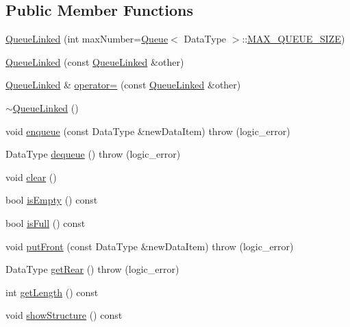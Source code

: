 \subsection*{\-Public \-Member \-Functions}
\begin{DoxyCompactItemize}
\item 
\hyperlink{class_queue_linked_ad356fca32ffd90c78d35d3eb5d84504b}{\-Queue\-Linked} (int max\-Number=\hyperlink{class_queue}{\-Queue}$<$ \-Data\-Type $>$\-::\hyperlink{class_queue_aaf3eed0540baaf6609b48910aacc7133}{\-M\-A\-X\-\_\-\-Q\-U\-E\-U\-E\-\_\-\-S\-I\-Z\-E})
\item 
\hyperlink{class_queue_linked_ad8749850191f8a4165c8e3a3a266bada}{\-Queue\-Linked} (const \hyperlink{class_queue_linked}{\-Queue\-Linked} \&other)
\item 
\hyperlink{class_queue_linked}{\-Queue\-Linked} \& \hyperlink{class_queue_linked_acec147d4de2139d2b6fd511bca6d6299}{operator=} (const \hyperlink{class_queue_linked}{\-Queue\-Linked} \&other)
\item 
\hyperlink{class_queue_linked_aed85fa73c60384a3d0c676c0ebbbca19}{$\sim$\-Queue\-Linked} ()
\item 
void \hyperlink{class_queue_linked_a7196448729d053f85f255674c7a57a02}{enqueue} (const \-Data\-Type \&new\-Data\-Item)  throw (logic\-\_\-error)
\item 
\-Data\-Type \hyperlink{class_queue_linked_ac0656892f605af3b952c71706d3af55d}{dequeue} ()  throw (logic\-\_\-error)
\item 
void \hyperlink{class_queue_linked_a32c66945765e5d42bbb988b1cdf43886}{clear} ()
\item 
bool \hyperlink{class_queue_linked_a425b83383323217c924a41a0226f7022}{is\-Empty} () const 
\item 
bool \hyperlink{class_queue_linked_a3de199675ee629f9d20c48d0e2b65f71}{is\-Full} () const 
\item 
void \hyperlink{class_queue_linked_a838a51b8023f9cf3a5a24abb67ae1ee4}{put\-Front} (const \-Data\-Type \&new\-Data\-Item)  throw (logic\-\_\-error)
\item 
\-Data\-Type \hyperlink{class_queue_linked_a2934f746096e31b9728de11f42bdc3cd}{get\-Rear} ()  throw (logic\-\_\-error)
\item 
int \hyperlink{class_queue_linked_ab2d7fc0a927f3fe1e2ac44cc042bb961}{get\-Length} () const 
\item 
void \hyperlink{class_queue_linked_a57d5dd5336545ddc7d1b22cee40fb017}{show\-Structure} () const 
\end{DoxyCompactItemize}
